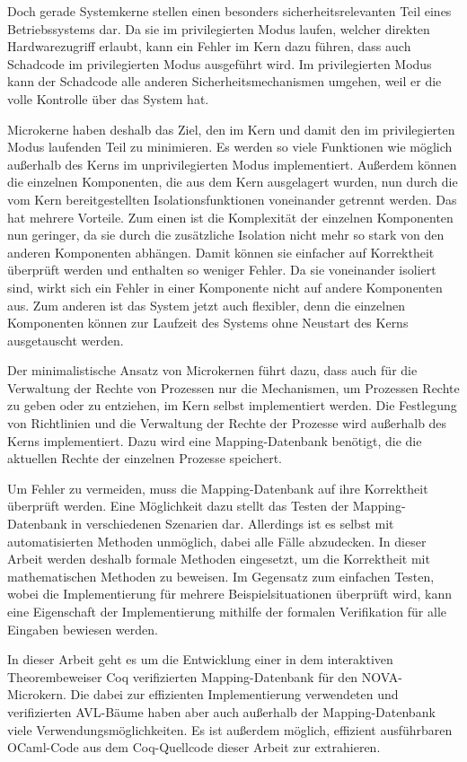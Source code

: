 \documentclass[a4paper, parskip]{scrartcl}
\begin{document}
Doch gerade Systemkerne stellen einen besonders sicherheitsrelevanten Teil eines Betriebssystems dar.
Da sie im privilegierten Modus laufen, welcher direkten Hardwarezugriff erlaubt, kann ein Fehler im Kern dazu führen, dass auch Schadcode im privilegierten Modus ausgeführt wird.
Im privilegierten Modus kann der Schadcode alle anderen Sicherheitsmechanismen umgehen, weil er die volle Kontrolle über das System hat.

Microkerne haben deshalb das Ziel, den im Kern und damit den im privilegierten Modus laufenden Teil zu minimieren. 
Es werden so viele Funktionen wie möglich außerhalb des Kerns im unprivilegierten Modus implementiert. 
Außerdem können die einzelnen Komponenten, die aus dem Kern ausgelagert wurden, nun durch die vom Kern bereitgestellten Isolationsfunktionen voneinander getrennt werden. 
Das hat mehrere Vorteile.
Zum einen ist die Komplexität der einzelnen Komponenten nun geringer, da sie durch die zusätzliche Isolation nicht mehr so stark von den anderen Komponenten abhängen. 
Damit können sie einfacher auf Korrektheit überprüft werden und enthalten so weniger Fehler. 
Da sie voneinander isoliert sind, wirkt sich ein Fehler in einer Komponente nicht auf andere Komponenten aus.
Zum anderen ist das System jetzt auch flexibler, denn die einzelnen Komponenten können zur Laufzeit des Systems ohne Neustart des Kerns ausgetauscht werden.

Der minimalistische Ansatz von Microkernen führt dazu, dass auch für die Verwaltung der Rechte von Prozessen nur die Mechanismen, um Prozessen Rechte zu geben oder zu entziehen, im Kern selbst implementiert werden.
Die Festlegung von Richtlinien und die Verwaltung der Rechte der Prozesse wird außerhalb des Kerns implementiert.
Dazu wird eine Mapping-Datenbank benötigt, die die aktuellen Rechte der einzelnen Prozesse speichert.

Um Fehler zu vermeiden, muss die Mapping-Datenbank auf ihre Korrektheit überprüft werden.
Eine Möglichkeit dazu stellt das Testen der Mapping-Datenbank in verschiedenen Szenarien dar.
Allerdings ist es selbst mit automatisierten Methoden unmöglich, dabei alle Fälle abzudecken.
In dieser Arbeit werden deshalb formale Methoden eingesetzt, um die Korrektheit mit mathematischen Methoden zu beweisen.
Im Gegensatz zum einfachen Testen, wobei die Implementierung für mehrere Beispielsituationen überprüft wird, kann eine Eigenschaft der Implementierung mithilfe der formalen Verifikation für alle Eingaben bewiesen werden.

In dieser Arbeit geht es um die Entwicklung einer in dem interaktiven Theorembeweiser Coq\autocite{coq-web} verifizierten Mapping-Datenbank für den NOVA-Microkern.
Die dabei zur effizienten Implementierung verwendeten und verifizierten AVL-Bäume haben aber auch außerhalb der Mapping-Datenbank viele Verwendungsmöglichkeiten. 
Es ist außerdem möglich, effizient ausführbaren OCaml-Code aus dem Coq-Quellcode dieser Arbeit zur extrahieren.
\end{document}
